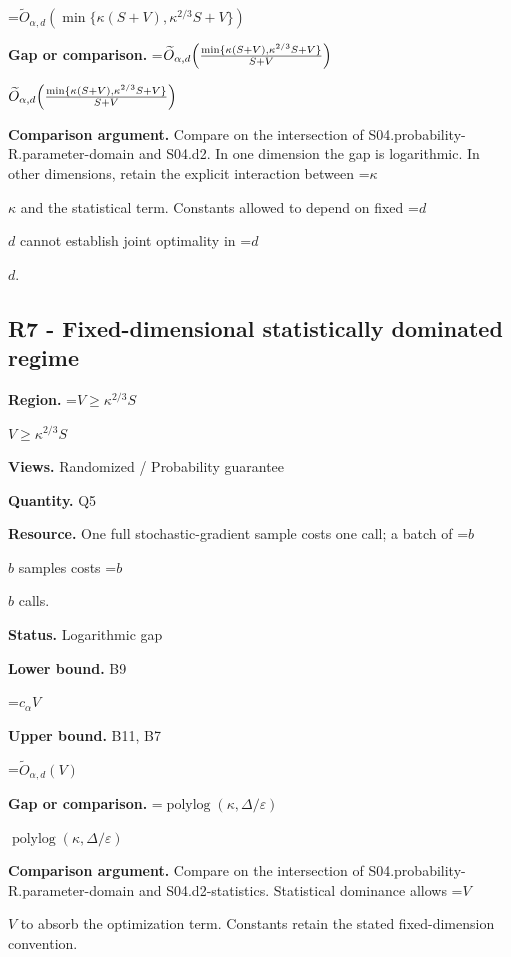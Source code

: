 \documentclass[10pt,a4paper]{article}
\newcommand{\AtlasMath}[1]{\par\begingroup\centering\setbox0=\hbox{$\displaystyle #1$}\ifdim\wd0>1.4\linewidth\typeout{ATLAS WIDE FORMULA: \the\wd0}\fi\ifdim\wd0>\linewidth\resizebox{\linewidth}{!}{\box0}\else\box0\fi\par\endgroup}
\newcommand{\AtlasInlineMath}[1]{\begingroup\setbox0=\hbox{$#1$}\ifdim\wd0>.4\linewidth\endgroup\AtlasMath{#1}\else\endgroup$#1$\fi}
\begin{document}
\AtlasMath{\widetilde{O}_{\alpha,d}(\min\{\kappa(S+V),\kappa^{2/3}S+V\})}


\textbf{Gap or comparison.} \AtlasInlineMath{\widetilde{O}_{\alpha,d}\!\left({\min\{\kappa(S+V),\kappa^{2/3}S+V\}\over S+V}\right)}



\textbf{Comparison argument.} Compare on the intersection of S04.probability-R.parameter-domain and S04.d2. In one dimension the gap is logarithmic. In other dimensions, retain the explicit interaction between \AtlasInlineMath{\kappa} and the statistical term. Constants allowed to depend on fixed \AtlasInlineMath{d} cannot establish joint optimality in \AtlasInlineMath{d}.



\subsection{R7 - Fixed-dimensional statistically dominated regime}


\textbf{Region.} \AtlasInlineMath{V\ge \kappa^{2/3}S}



\textbf{Views.} Randomized / Probability guarantee



\textbf{Quantity.} Q5



\textbf{Resource.} One full stochastic-gradient sample costs one call; a batch of \AtlasInlineMath{b} samples costs \AtlasInlineMath{b} calls.



\textbf{Status.} Logarithmic gap



\textbf{Lower bound.} B9



\AtlasMath{c_\alpha V}


\textbf{Upper bound.} B11, B7



\AtlasMath{\widetilde{O}_{\alpha,d}(V)}


\textbf{Gap or comparison.} \AtlasInlineMath{\operatorname{polylog}(\kappa,\Delta/\varepsilon)}



\textbf{Comparison argument.} Compare on the intersection of S04.probability-R.parameter-domain and S04.d2-statistics. Statistical dominance allows \AtlasInlineMath{V} to absorb the optimization term. Constants retain the stated fixed-dimension convention.
\end{document}
